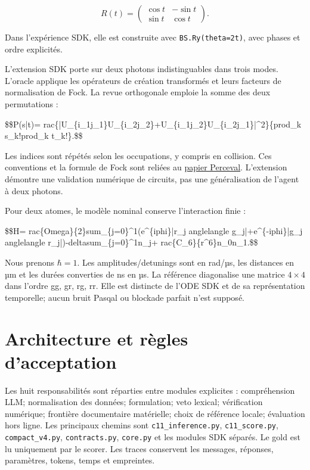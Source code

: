 \documentclass[11pt]{article}
\begin{document}
\[R(t)=\begin{pmatrix}\cos t&-\sin t\\\sin t&\cos t\end{pmatrix}.\]

Dans l'expérience SDK, elle est construite avec \texttt{BS.Ry(theta=2t)}, avec phases et ordre explicités.

L'extension SDK porte sur deux photons indistinguables dans trois modes. L'oracle applique les opérateurs de création transformés et leurs facteurs de normalisation de Fock. La revue orthogonale emploie la somme des deux permutations :

\$\$P(s|t)=
rac\{|U\_\{i\_1j\_1\}U\_\{i\_2j\_2\}+U\_\{i\_1j\_2\}U\_\{i\_2j\_1\}|\textasciicircum{}2\}\{prod\_k s\_k!prod\_k t\_k!\}.\$\$

Les indices sont répétés selon les occupations, y compris en collision. Ces conventions et la formule de Fock sont reliées au \href{\detokenize{https://arxiv.org/html/2204.00602}}{papier Perceval}. L'extension démontre une validation numérique de circuits, pas une généralisation de l'agent à deux photons.

Pour deux atomes, le modèle nominal conserve l'interaction finie :

\$\$H=
rac\{Omega\}\{2\}sum\_\{j=0\}\textasciicircum{}1(e\textasciicircum{}\{iphi\}|r\_j
anglelangle g\_j|+e\textasciicircum{}\{-iphi\}|g\_j
anglelangle r\_j|)-deltasum\_\{j=0\}\textasciicircum{}1n\_j+
rac\{C\_6\}\{r\textasciicircum{}6\}n\_0n\_1.\$\$

Nous prenons $\hbar=1$. Les amplitudes/detunings sont en rad/µs, les distances en µm et les durées converties de ns en µs. La référence diagonalise une matrice $4\times4$ dans l'ordre gg, gr, rg, rr. Elle est distincte de l'ODE SDK et de sa représentation temporelle; aucun bruit Pasqal ou blockade parfait n'est supposé.

\section{Architecture et règles d'acceptation}

Les huit responsabilités sont réparties entre modules explicites : compréhension LLM; normalisation des données; formulation; veto lexical; vérification numérique; frontière documentaire matérielle; choix de référence locale; évaluation hors ligne. Les principaux chemins sont \texttt{c11\_inference.py}, \texttt{c11\_score.py}, \texttt{compact\_v4.py}, \texttt{contracts.py}, \texttt{core.py} et les modules SDK séparés. Le gold est lu uniquement par le scorer. Les traces conservent les messages, réponses, paramètres, tokens, temps et empreintes.
\end{document}
